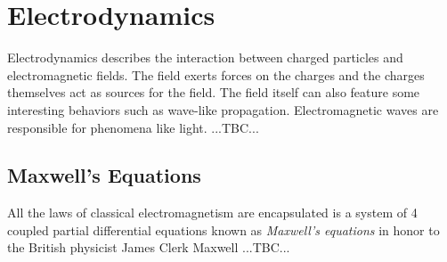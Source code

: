 \section{Electrodynamics}
Electrodynamics describes the interaction between charged particles and electromagnetic fields. The field exerts forces on the charges and the charges themselves act as sources for the field. The field itself can also feature some interesting behaviors such as wave-like propagation. Electromagnetic waves are responsible for phenomena like light. ...TBC...

\subsection{Maxwell's Equations}
All the laws of classical electromagnetism are encapsulated is a system of 4 coupled partial differential equations known as \emph{Maxwell's equations} in honor to the British physicist James Clerk Maxwell ...TBC...



